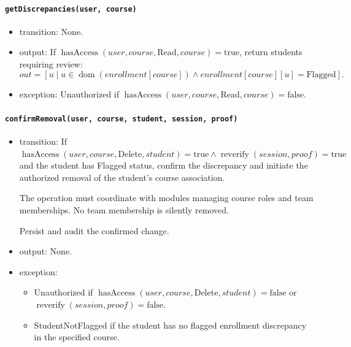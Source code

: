 \documentclass[12pt, titlepage]{article}
\begin{document}
\paragraph{\texttt{getDiscrepancies(user, course)}}
\begin{itemize}
    \item transition: None.

    \item output: If $\operatorname{hasAccess}(user,course,\text{Read},course)=\text{true}$, return students requiring review:
    \[
    out=[
    u\mid
    u\in\operatorname{dom}(\mathit{enrollment}[course])
    \land
    \mathit{enrollment}[course][u]
    =\text{Flagged}
    ].
    \]

    \item exception: Unauthorized if $\operatorname{hasAccess}(user,course,\text{Read},course)=\text{false}$.
\end{itemize}

\paragraph{\texttt{confirmRemoval(user, course, student, session, proof)}}
\begin{itemize}
    \item transition: If $\operatorname{hasAccess}(user,course,\text{Delete},student)=\text{true}\land\operatorname{reverify}(session,proof)=\text{true}$ and the student has Flagged status, confirm the discrepancy and initiate the authorized removal of the student's course association.

    The operation must coordinate with modules managing course roles and team memberships. No team membership is silently removed.

    Persist and audit the confirmed change.

    \item output: None.

    \item exception:
    \begin{itemize}
        \item Unauthorized if $\operatorname{hasAccess}(user,course,\text{Delete},student)=\text{false}$ or $\operatorname{reverify}(session,proof)=\text{false}$.
        \item StudentNotFlagged if the student has no flagged enrollment discrepancy in the specified course.
    \end{itemize}
\end{itemize}
\end{document}
